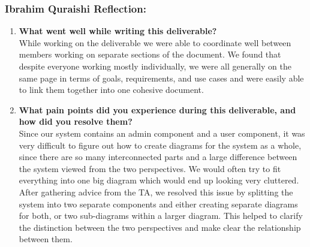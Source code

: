 
\subsubsection*{Ibrahim Quraishi Reflection:}
\begin{enumerate}
  \item \textbf{What went well while writing this deliverable?} \\
  While working on the deliverable we were able to coordinate well between members working on separate sections of the document. We found that despite everyone working mostly individually, we were all generally on the same page in terms of goals, requirements, and use cases and were easily able to link them together into one cohesive document. 

  \item \textbf{What pain points did you experience during this deliverable, and how did you resolve them?} \\
  Since our system contains an admin component and a user component, it was very difficult to figure out how to create diagrams for the system as a whole, since there are so many interconnected parts and a large difference between the system viewed from the two perspectives. We would often try to fit everything into one big diagram which would end up looking very cluttered. After gathering advice from the TA, we resolved this issue by splitting the system into two separate components and either creating separate diagrams for both, or two sub-diagrams within a larger diagram. This helped to clarify the distinction between the two perspectives and make clear the relationship between them.
\end{enumerate}






